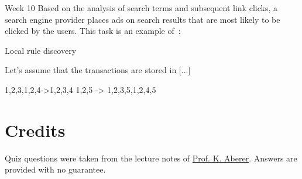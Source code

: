\documentclass[12pt,a4paper]{exam} %
\newcommand{\staff}{\href{http://people.epfl.ch//karl.aberer}{Prof. K. Aberer}}
\begin{document}
\begin{flushleft}
\begin{multicols*}{2}
\begin{questions}
Week 10
\question Based on the analysis of search terms and subsequent link clicks, a search engine provider places ads on  search results that are most likely to be clicked by the users.
This task is an example of~:
\begin{checkboxes}
\choice Local rule discovery
\end{checkboxes}

\question Let's assume that the transactions are stored in [...]




\begin{solution}
{1,2,3},{1,2,4}->{1,2,3,4}
{1,2,5} -> {1,2,3,5},{1,2,4,5}
\end{solution}


\end{questions}
\end{multicols*}
\end{flushleft}


\section*{Credits}
Quiz questions were taken from the lecture notes of \staff. Answers are provided with no guarantee.%

%
\end{document}
